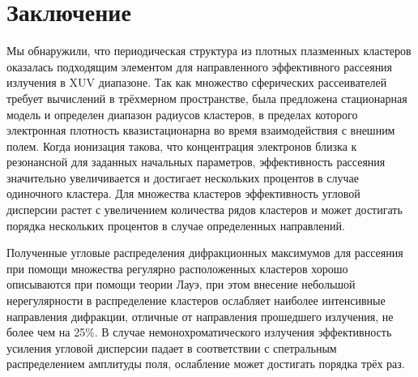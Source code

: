 \section{Заключение}

Мы обнаружили, что периодическая структура из плотных плазменных кластеров оказалась подходящим элементом для направленного эффективного рассеяния излучения в XUV диапазоне. Так как множество сферических рассеивателей требует вычислений в трёхмерном пространстве, была предложена стационарная модель и определен диапазон радиусов кластеров, в пределах которого электронная плотность квазистационарна во время взаимодействия с внешним полем. Когда ионизация такова, что концентрация электронов близка к резонансной для заданных начальных параметров, эффективность рассеяния значительно увеличивается и достигает нескольких процентов в случае одиночного кластера. Для множества кластеров эффективность угловой дисперсии растет с увеличением количества рядов кластеров и может достигать порядка нескольких процентов в случае определенных направлений.

Полученные угловые распределения дифракционных максимумов для рассеяния при помощи множества регулярно расположенных кластеров хорошо описываются при помощи теории Лауэ, при этом внесение небольшой нерегулярности в распределение кластеров ослабляет наиболее интенсивные направления дифракции, отличные от направления прошедшего излучения, не более чем на 25\%. В случае немонохроматического излучения эффективность усиления угловой дисперсии падает в соответствии с спетральным распределением амплитуды поля, ослабление может достигать порядка трёх раз.